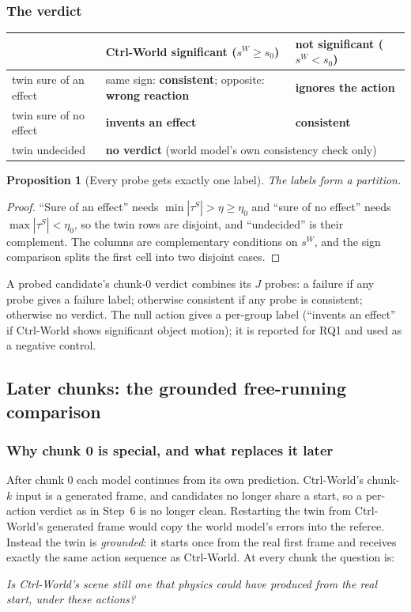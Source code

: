 \documentclass[11pt,a4paper]{article}
\theoremstyle{plain}
\newtheorem{proposition}{Proposition}
\theoremstyle{definition}
\theoremstyle{remark}
\begin{document}
\subsubsection{The verdict}
\begin{center}\small
\begin{tabular}{@{}lll@{}}
\toprule
 & Ctrl-World significant ($s^W\ge s_0$) & not significant ($s^W<s_0$)\\
\midrule
twin sure of an effect & same sign: \textbf{consistent}; opposite: \textbf{wrong reaction} & \textbf{ignores the action}\\
twin sure of no effect & \textbf{invents an effect} & \textbf{consistent}\\
twin undecided & \multicolumn{2}{l}{\textbf{no verdict} (world model's own consistency check only)}\\
\bottomrule
\end{tabular}
\end{center}
\begin{proposition}[Every probe gets exactly one label]\label{prop:partition}
The labels form a partition.
\end{proposition}
\begin{proof}
``Sure of an effect'' needs $\min|\tau^S|>\eta\ge\eta_0$ and ``sure of no effect'' needs $\max|\tau^S|<\eta_0$, so the twin rows are disjoint, and ``undecided'' is their complement. The columns are complementary conditions on $s^W$, and the sign comparison splits the first cell into two disjoint cases.
\end{proof}
A probed candidate's chunk-0 verdict combines its $J$ probes: a failure if any probe gives a failure label; otherwise consistent if any probe is consistent; otherwise no verdict. The null action gives a per-group label (``invents an effect'' if Ctrl-World shows significant object motion); it is reported for RQ1 and used as a negative control.

\subsection{Later chunks: the grounded free-running comparison}\label{sec:grounded}

\subsubsection{Why chunk 0 is special, and what replaces it later}
After chunk 0 each model continues from its own prediction. Ctrl-World's chunk-$k$ input is a generated frame, and candidates no longer share a start, so a per-action verdict as in Step~6 is no longer clean. Restarting the twin from Ctrl-World's generated frame would copy the world model's errors into the referee. Instead the twin is \emph{grounded}: it starts once from the real first frame and receives exactly the same action sequence as Ctrl-World. At every chunk the question is:
\begin{center}
\emph{Is Ctrl-World's scene still one that physics could have produced from the real start, under these actions?}
\end{center}
\end{document}
